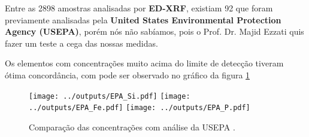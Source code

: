 Entre as 2898 amostras analisadas por \textbf{ED-XRF}, existiam 92 que foram 
previamente analisadas pela \textbf{United States Environmental Protection 
Agency (USEPA)}, porém nós não sabíamos, pois o Prof. Dr. Majid Ezzati quis 
fazer um teste a cega das nossas medidas. 

Os elementos com concentrações muito acima do limite de detecção tiveram ótima
concordância, com pode ser observado no gráfico da figura \ref{fig:epa} 

\begin{figure}[H]
  \centering
    \texttt{[image: ../outputs/EPA\_Si.pdf]}
    \texttt{[image: ../outputs/EPA\_Fe.pdf]}
    \texttt{[image: ../outputs/EPA\_P.pdf]}
  \caption{Comparação das concentrações com análise da USEPA \label{fig:epa}.}
\end{figure}
